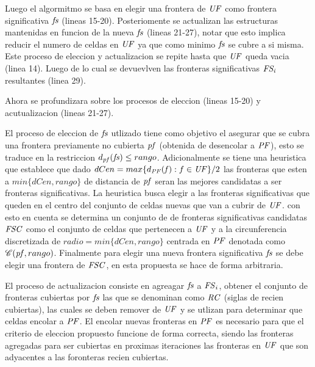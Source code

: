 Luego el algormitmo se basa en elegir una frontera de $\mathit{UF}$ como frontera
significativa $\mathit{fs}$ (lineas 15-20). Posteriomente se actualizan las
estructuras mantenidas en funcion de la nueva $\mathit{fs}$ (lineas 21-27), notar
que esto implica reducir el numero de celdas en $\mathit{UF}$ ya que como minimo
$\mathit{fs}$ se cubre a si misma. Este proceso de eleccion y actualizacion se
repite hasta que $\mathit{UF}$ queda vacia (linea 14). Luego de lo cual se
devuevlven las fronteras significativas $\mathit{FS_i}$ resultantes (linea 29).
 
Ahora se profundizara sobre los procesos de eleccion (lineas 15-20) y
acutualizacion (lineas 21-27).

El proceso de eleccion de $\mathit{fs}$ utlizado tiene como objetivo el asegurar
que se cubra una frontera previamente no cubierta $\mathit{pf}$ (obtenida de
desencolar a $\mathit{PF}$), esto se traduce en la restriccion
$d_{\mathit{pf}}(\mathit{fs}) \leq rango$. Adicionalmente se tiene una heuristica que
establece que dado $dCen = max\{ d_{\mathit{PF}}(\mathit{f}) : f\in\mathit{UF} \}/2$ las
fronteras que esten a $min \{dCen, rango\}$ de distancia de $\mathit{pf}$ seran las
mejores candidatas a ser fronteras significativas. La heuristica busca elegir a
las fronteras significativas que queden en el centro del conjunto de celdas
nuevas que van a cubrir de $\mathit{UF}$. con esto en cuenta se determina un
conjunto de de fronteras significativas candidatas $\mathit{FSC}$ como el conjunto
de celdas que pertenecen a $\mathit{UF}$ y a la circunferencia discretizada
de $radio = min \{dCen, rango\}$ centrada en $\mathit{PF}$ denotada como
$\mathscr{C}(\mathit{pf},rango)$. Finalmente para elegir una nueva frontera
significativa $\mathit{fs}$ se debe elegir una frontera de $\mathit{FSC}$, en esta
propuesta se hace de forma arbitraria.

El proceso de actualizacion consiste en agreagar $\mathit{fs}$ a $\mathit{FS}_i$, obtener el
conjunto de fronteras cubiertas por $\mathit{fs}$ las que se denominan como
$\mathit{RC}$ (siglas de recien cubiertas), las cuales se deben remover de
$\mathit{UF}$ y se utlizan para determinar que celdas encolar a $\mathit{PF}$.
El encolar nuevas fronteras en $\mathit{PF}$ es necesario para que el criterio de
eleccion propuesto funcione de forma correcta, siendo las fronteras agregadas
para ser cubiertas en proximas iteraciones las fronteras en $\mathit{UF}$ que son
adyacentes a las foronteras recien cubiertas.

